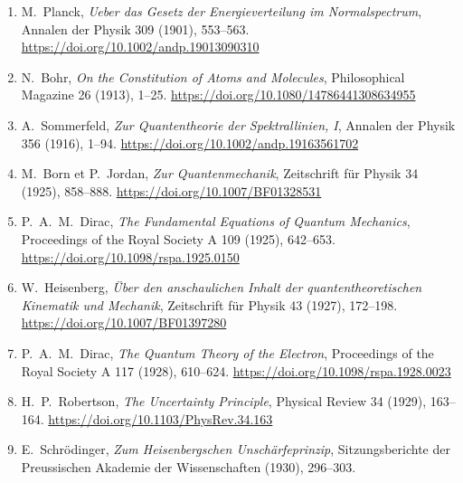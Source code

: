 \begin{enumerate}
\renewcommand{\labelenumi}{[\arabic{enumi}]}
\item\hypertarget{radionbib:Planck1901}{}
M.~Planck,
\emph{Ueber das Gesetz der Energieverteilung im Normalspectrum},
Annalen der Physik 309 (1901), 553--563.
\url{https://doi.org/10.1002/andp.19013090310}

\item\hypertarget{radionbib:Bohr1913}{}
N.~Bohr,
\emph{On the Constitution of Atoms and Molecules},
Philosophical Magazine 26 (1913), 1--25.
\url{https://doi.org/10.1080/14786441308634955}

\item\hypertarget{radionbib:Sommerfeld1916}{}
A.~Sommerfeld,
\emph{Zur Quantentheorie der Spektrallinien, I},
Annalen der Physik 356 (1916), 1--94.
\url{https://doi.org/10.1002/andp.19163561702}

\item\hypertarget{radionbib:BornJordan1925}{}
M.~Born et P.~Jordan,
\emph{Zur Quantenmechanik},
Zeitschrift für Physik 34 (1925), 858--888.
\url{https://doi.org/10.1007/BF01328531}

\item\hypertarget{radionbib:Dirac1925}{}
P.~A.~M.~Dirac,
\emph{The Fundamental Equations of Quantum Mechanics},
Proceedings of the Royal Society A 109 (1925), 642--653.
\url{https://doi.org/10.1098/rspa.1925.0150}

\item\hypertarget{radionbib:Heisenberg1927}{}
W.~Heisenberg,
\emph{Über den anschaulichen Inhalt der quantentheoretischen Kinematik und Mechanik},
Zeitschrift für Physik 43 (1927), 172--198.
\url{https://doi.org/10.1007/BF01397280}

\item\hypertarget{radionbib:Dirac1928}{}
P.~A.~M.~Dirac,
\emph{The Quantum Theory of the Electron},
Proceedings of the Royal Society A 117 (1928), 610--624.
\url{https://doi.org/10.1098/rspa.1928.0023}

\item\hypertarget{radionbib:Robertson1929}{}
H.~P.~Robertson,
\emph{The Uncertainty Principle},
Physical Review 34 (1929), 163--164.
\url{https://doi.org/10.1103/PhysRev.34.163}

\item\hypertarget{radionbib:Schrodinger1930}{}
E.~Schrödinger,
\emph{Zum Heisenbergschen Unschärfeprinzip},
Sitzungsberichte der Preussischen Akademie der Wissenschaften (1930), 296--303.


\end{enumerate}
